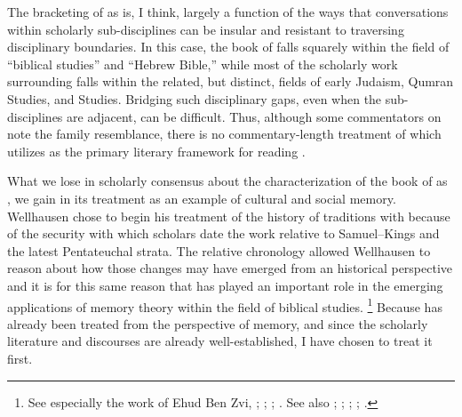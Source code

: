 The bracketing of \chronicles as \rwb is, I think, largely a function of the ways that conversations within scholarly sub-disciplines can be insular and resistant to traversing disciplinary boundaries. In this case, the book of \chronicles falls squarely within the field of ``biblical studies'' and ``Hebrew Bible,'' while most of the scholarly work surrounding \rwb falls within the related, but distinct, fields of early Judaism, Qumran Studies, and \secondtemple Studies. Bridging such disciplinary gaps, even when the sub-disciplines are adjacent, can be difficult. Thus, although some commentators on \chronicles note the family resemblance, there is no commentary-length treatment of \chronicles which utilizes \rwb as the primary literary framework for reading \chronicles.

What we lose in scholarly consensus about the characterization of the book of \chronicles as \rwb, we gain in its treatment as an example of cultural and social memory. Wellhausen chose to begin his treatment of the history of traditions with \chronicles because of the security with which scholars date the work relative to Samuel--Kings and the latest Pentateuchal strata. The relative chronology allowed Wellhausen to reason about how those changes may have emerged from an historical perspective and it is for this same reason that \chronicles has played an important role in the emerging applications of memory theory within the field of biblical studies.%
\footnote{%
    See especially the work of Ehud Ben Zvi,
    \cite*{benzvi_st2017};
    \cite*{benzvi-a_evans-williams2013};
    \cite*{benzvi-b_evans-williams2013};
    \cite*{benzvi_jonker2011}.
    See also \cite{wilson2017};
    \cite[26--30]{rogerson2010};
    \cite[104--114]{blenkinsopp2013};
    \cite[148-166]{wright2014};
    \cite{jarick_frohlich2019}.
    }
Because \chronicles has already been treated from the perspective of memory, and since the scholarly literature and discourses are already well-established, I have chosen to treat it first.

